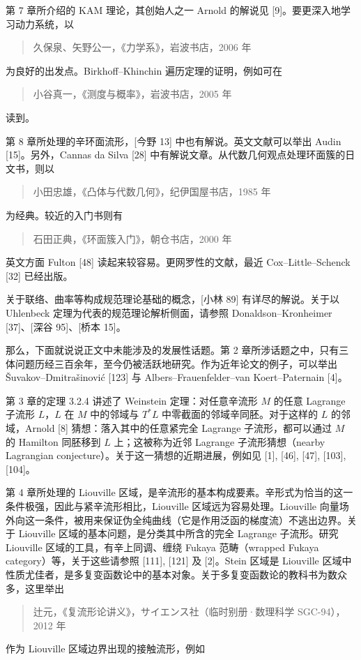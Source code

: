 第 7 章所介绍的 KAM 理论，其创始人之一 Arnold 的解说见 [9]。要更深入地学习动力系统，以
\begin{quote}
\noindent [久矢 06] 久保泉、矢野公一，《力学系》，岩波书店，2006 年
\end{quote}
为良好的出发点。Birkhoff–Khinchin 遍历定理的证明，例如可在
\begin{quote}
\noindent [小谷 05] 小谷真一，《测度与概率》，岩波书店，2005 年
\end{quote}
读到。

第 8 章所处理的辛环面流形，[今野 13] 中也有解说。英文文献可以举出 Audin [15]。另外，Cannas da Silva [28] 中有解说文章。从代数几何观点处理环面簇的日文书，则以
\begin{quote}
\noindent [小田 85] 小田忠雄，《凸体与代数几何》，纪伊国屋书店，1985 年
\end{quote}
为经典。较近的入门书则有
\begin{quote}
\noindent [石田 00] 石田正典，《环面簇入门》，朝仓书店，2000 年
\end{quote}
英文方面 Fulton [48] 读起来较容易。更网罗性的文献，最近 Cox–Little–Schenck [32] 已经出版。

关于联络、曲率等构成规范理论基础的概念，[小林 89] 有详尽的解说。关于以 Uhlenbeck 定理为代表的规范理论解析侧面，请参照 Donaldson–Kronheimer [37]、[深谷 95]、[桥本 15]。

那么，下面就说说正文中未能涉及的发展性话题。第 2 章所涉话题之中，只有三体问题历经三百余年，至今仍被活跃地研究。作为近年论文的例子，可以举出 Šuvakov–Dmitrašinović [123] 与 Albers–Frauenfelder–van Koert–Paternain [4]。

第 3 章的定理 3.2.4 讲述了 Weinstein 定理：对任意辛流形 $M$ 的任意 Lagrange 子流形 $L$，$L$ 在 $M$ 中的邻域与 $T^*L$ 中零截面的邻域辛同胚。对于这样的 $L$ 的邻域，Arnold [8] 猜想：落入其中的任意紧完全 Lagrange 子流形，都可以通过 $M$ 的 Hamilton 同胚移到 $L$ 上；这被称为近邻 Lagrange 子流形猜想（nearby Lagrangian conjecture）。关于这一猜想的近期进展，例如见 [1], [46], [47], [103], [104]。

第 4 章所处理的 Liouville 区域，是辛流形的基本构成要素。辛形式为恰当的这一条件极强，因此与紧辛流形相比，Liouville 区域远为容易处理。Liouville 向量场外向这一条件，被用来保证伪全纯曲线（它是作用泛函的梯度流）不逃出边界。关于 Liouville 区域的基本问题，是分类其中所含的完全 Lagrange 子流形。研究 Liouville 区域的工具，有辛上同调、缠绕 Fukaya 范畴（wrapped Fukaya category）等，关于这些请参照 [111], [121] 及 [2]。Stein 区域是 Liouville 区域中性质尤佳者，是多复变函数论中的基本对象。关于多复变函数论的教科书为数众多，这里举出
\begin{quote}
\noindent [辻 12] 辻元，《复流形论讲义》，サイエンス社（临时别册·数理科学 SGC-94），2012 年
\end{quote}
作为 Liouville 区域边界出现的接触流形，例如

